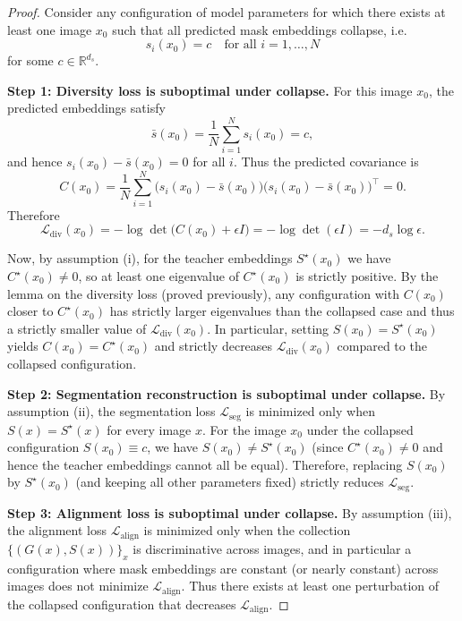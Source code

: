 \documentclass[12pt]{article}
\begin{document}
\begin{proof}
Consider any configuration of model parameters for which there exists at least
one image $x_0$ such that all predicted mask embeddings collapse, i.e.\
\[
s_i(x_0) = c \quad \text{for all } i = 1,\dots,N
\]
for some $c \in \mathbb{R}^{d_s}$.

\medskip
\noindent\textbf{Step 1: Diversity loss is suboptimal under collapse.}
For this image $x_0$, the predicted embeddings satisfy
\[
\bar{s}(x_0) = \frac{1}{N} \sum_{i=1}^N s_i(x_0) = c,
\]
and hence $s_i(x_0) - \bar{s}(x_0) = 0$ for all $i$.
Thus the predicted covariance is
\[
C(x_0)
= \frac{1}{N} \sum_{i=1}^N
\big(s_i(x_0) - \bar{s}(x_0)\big)\big(s_i(x_0) - \bar{s}(x_0)\big)^\top
= 0.
\]
Therefore
\[
\mathcal{L}_{\mathrm{div}}(x_0)
= - \log \det\big(C(x_0) + \epsilon I\big)
= - \log \det(\epsilon I)
= - d_s \log \epsilon.
\]

Now, by assumption (i), for the teacher embeddings $S^\star(x_0)$ we have
$C^\star(x_0) \neq 0$, so at least one eigenvalue of $C^\star(x_0)$ is
strictly positive.
By the lemma on the diversity loss (proved previously), any configuration
with $C(x_0)$ closer to $C^\star(x_0)$ has strictly larger eigenvalues than
the collapsed case and thus a strictly smaller value of
$\mathcal{L}_{\mathrm{div}}(x_0)$.
In particular, setting $S(x_0) = S^\star(x_0)$ yields $C(x_0) = C^\star(x_0)$
and strictly decreases $\mathcal{L}_{\mathrm{div}}(x_0)$ compared to the
collapsed configuration.

\medskip
\noindent\textbf{Step 2: Segmentation reconstruction is suboptimal under collapse.}
By assumption (ii), the segmentation loss $\mathcal{L}_{\mathrm{seg}}$ is
minimized only when $S(x) = S^\star(x)$ for every image $x$.
For the image $x_0$ under the collapsed configuration $S(x_0) \equiv c$,
we have $S(x_0) \neq S^\star(x_0)$ (since $C^\star(x_0) \neq 0$ and hence
the teacher embeddings cannot all be equal).
Therefore, replacing $S(x_0)$ by $S^\star(x_0)$ (and keeping all other
parameters fixed) strictly reduces $\mathcal{L}_{\mathrm{seg}}$.

\medskip
\noindent\textbf{Step 3: Alignment loss is suboptimal under collapse.}
By assumption (iii), the alignment loss $\mathcal{L}_{\mathrm{align}}$ is
minimized only when the collection $\{(G(x), S(x))\}_x$ is discriminative
across images, and in particular a configuration where mask embeddings are
constant (or nearly constant) across images does not minimize
$\mathcal{L}_{\mathrm{align}}$.
Thus there exists at least one perturbation of the collapsed configuration
that decreases $\mathcal{L}_{\mathrm{align}}$.


\end{proof}
\end{document}
